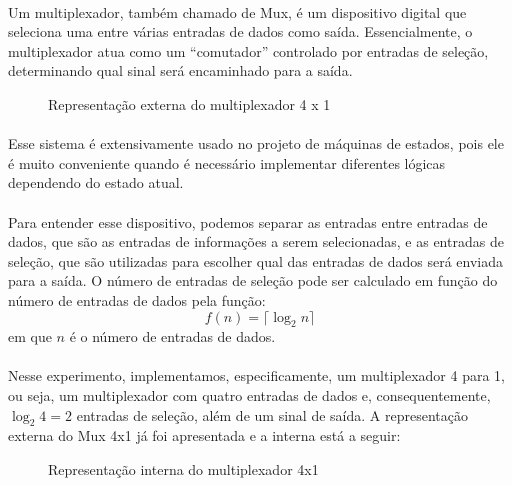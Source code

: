 \documentclass[a4paper,12pt]{article}
\begin{document}
\paragraph{}
Um multiplexador, também chamado de Mux, é um dispositivo digital que seleciona uma entre várias entradas de dados como saída. Essencialmente, o multiplexador atua como um ``comutador'' controlado por entradas de seleção, determinando qual sinal será encaminhado para a saída.

\begin{figure}[H]
    \centering
    
    \caption{Representação externa do multiplexador 4 x 1}
    \label{fig:Mux_externa}
\end{figure}

\paragraph{}
Esse sistema é extensivamente usado no projeto de máquinas de estados, pois ele é muito conveniente quando é necessário implementar diferentes lógicas dependendo do estado atual.

\newpage
\paragraph{}
Para entender esse dispositivo, podemos separar as entradas entre entradas de dados, que são as entradas de informações a serem selecionadas, e as entradas de seleção, que são utilizadas para escolher qual das entradas de dados será enviada para a saída. O número de entradas de seleção pode ser calculado em função do número de entradas de dados pela função: 
\[
f(n) = \lceil \log_2n \rceil
\]
em que $n$ é o número de entradas de dados.

\paragraph{}
Nesse experimento, implementamos, especificamente, um multiplexador 4 para 1, ou seja, um multiplexador com quatro entradas de dados e, consequentemente, $\log_2 4 = 2$ entradas de seleção, além de um sinal de saída. A representação externa do Mux 4x1 já foi apresentada e a interna está a seguir:

\begin{figure}[H]
    \centering
    
    \caption{Representação interna do multiplexador 4x1}
    \label{fig:Mux_interna}
\end{figure}
\end{document}
